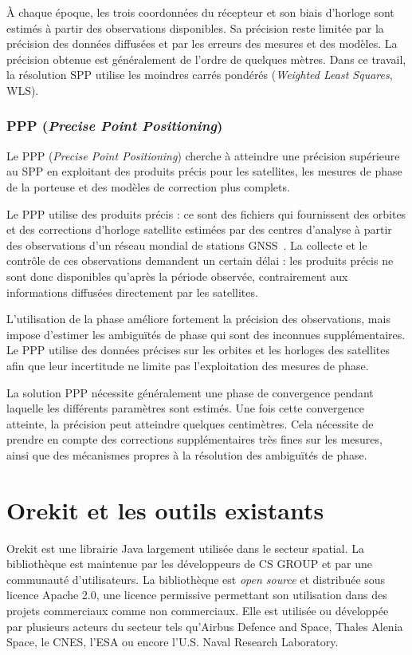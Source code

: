 À chaque époque, les trois coordonnées du récepteur et son biais d'horloge sont
estimés à partir des observations disponibles. Sa
précision reste limitée par la précision des données diffusées et
par les erreurs des mesures et des modèles. La précision obtenue est généralement de l'ordre de
quelques mètres. Dans ce travail, la résolution SPP utilise les moindres carrés pondérés (\textit{Weighted Least Squares}, WLS).


\subsubsection{PPP (\textit{Precise Point Positioning})}

Le PPP (\textit{Precise Point Positioning}) cherche à atteindre une précision supérieure au SPP en exploitant
des produits précis pour les satellites, les mesures de phase de la porteuse
et des modèles de correction plus complets.

Le PPP utilise des produits précis : ce sont des fichiers qui fournissent des orbites et des corrections d'horloge
satellite estimées par des centres d'analyse à partir des observations d'un
réseau mondial de stations GNSS~\cite{koubaHeroux2001}. La collecte et le contrôle de ces
observations demandent un certain délai : les produits précis ne sont
donc disponibles qu'après la période observée, contrairement aux informations
diffusées directement par les satellites.

L'utilisation de la phase améliore fortement la précision des observations,
mais impose d'estimer les ambiguïtés de phase qui sont des inconnues supplémentaires. Le PPP utilise
des données précises sur les orbites et les horloges des
satellites afin que leur incertitude ne limite pas l'exploitation des mesures
de phase.

La solution PPP nécessite généralement une phase de convergence pendant
laquelle les différents paramètres sont estimés. Une fois cette convergence
atteinte, la précision peut atteindre quelques centimètres. Cela nécessite de
prendre en compte des corrections supplémentaires très fines sur les mesures,
ainsi que des mécanismes propres à la résolution des ambiguïtés de phase.


\section{Orekit et les outils existants}

Orekit est une librairie Java largement utilisée dans le secteur spatial. La bibliothèque est
maintenue par les développeurs de CS GROUP et par une communauté d'utilisateurs.
La bibliothèque est \textit{open source} et distribuée sous licence Apache 2.0, une licence
permissive permettant son utilisation dans des projets commerciaux comme non commerciaux.
Elle est utilisée ou développée par plusieurs acteurs du secteur tels qu'Airbus
Defence and Space, Thales Alenia Space, le CNES, l'ESA ou encore l'U.S. Naval Research Laboratory.

